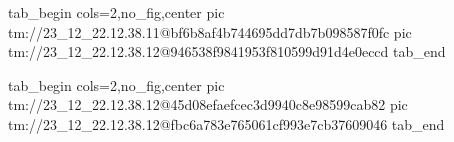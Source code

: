  
 
 
 
 

\qqSecOrig


\ifcmt
  tab_begin cols=2,no_fig,center
    pic tm://23_12_22.12.38.11@bf6b8af4b744695dd7db7b098587f0fc
    pic tm://23_12_22.12.38.12@946538f9841953f810599d91d4e0eccd
  tab_end
\fi


\ifcmt
  tab_begin cols=2,no_fig,center
    pic tm://23_12_22.12.38.12@45d08efaefcec3d9940c8e98599cab82
    pic tm://23_12_22.12.38.12@fbc6a783e765061cf993e7cb37609046
  tab_end
\fi

